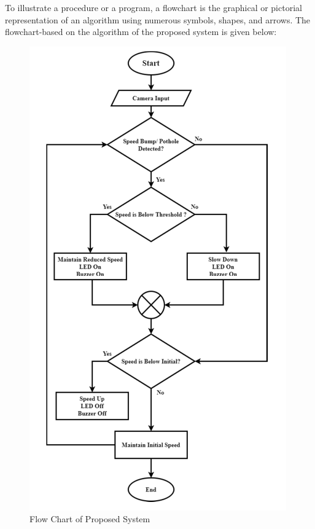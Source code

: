 \noindent
To illustrate a procedure or a program, a flowchart is the graphical or pictorial representation of an algorithm using numerous symbols, shapes, and arrows. The flowchart-based on the algorithm of the proposed system is given below: 
\begin{figure}[h]
    \centering
    \includegraphics[scale=1]{Figures/chapter3/flowchart.png}
    \caption{Flow Chart of Proposed System}
    \label{fig:flowchart}
\end{figure}